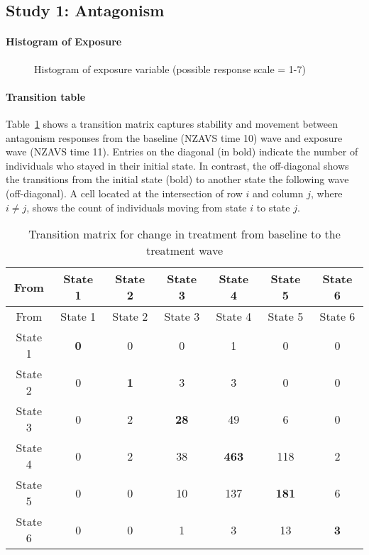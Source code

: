 \documentclass[
  singlecolumn]{article}
\let\oldparagraph\paragraph
\renewcommand{\paragraph}[1]{\oldparagraph{#1}\mbox{}}
\begin{document}
\subsection{Study 1: Antagonism}\label{study-1-antagonism}

\paragraph{Histogram of Exposure}\label{histogram-of-exposure}

\begin{figure}


\caption{\label{fig-histogram-antagonism}Histogram of exposure variable
(possible response scale = 1-7)}

\end{figure}%

\paragraph{Transition table}\label{transition-table}

Table~\ref{tbl-transition-antagonism} shows a transition matrix captures
stability and movement between antagonism responses from the baseline
(NZAVS time 10) wave and exposure wave (NZAVS time 11). Entries on the
diagonal (in bold) indicate the number of individuals who stayed in
their initial state. In contrast, the off-diagonal shows the transitions
from the initial state (bold) to another state the following wave
(off-diagonal). A cell located at the intersection of row \(i\) and
column \(j\), where \(i \neq j\), shows the count of individuals moving
from state \(i\) to state \(j\).

\begin{longtable}[]{@{}ccccccc@{}}
\caption{Transition matrix for change in treatment from baseline to the
treatment wave}\label{tbl-transition-antagonism}\tabularnewline
\toprule\noalign{}
From & State 1 & State 2 & State 3 & State 4 & State 5 & State 6 \\
\midrule\noalign{}
\endfirsthead
\toprule\noalign{}
From & State 1 & State 2 & State 3 & State 4 & State 5 & State 6 \\
\midrule\noalign{}
\endhead
\bottomrule\noalign{}
\endlastfoot
State 1 & \textbf{0} & 0 & 0 & 1 & 0 & 0 \\
State 2 & 0 & \textbf{1} & 3 & 3 & 0 & 0 \\
State 3 & 0 & 2 & \textbf{28} & 49 & 6 & 0 \\
State 4 & 0 & 2 & 38 & \textbf{463} & 118 & 2 \\
State 5 & 0 & 0 & 10 & 137 & \textbf{181} & 6 \\
State 6 & 0 & 0 & 1 & 3 & 13 & \textbf{3} \\
\end{longtable}
\end{document}
